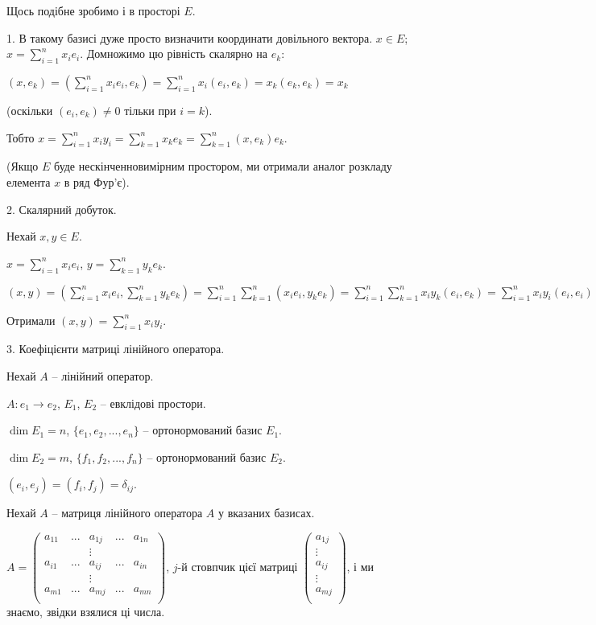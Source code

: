 Щось подібне зробимо і в просторі $E$.

1. В такому базисі дуже просто визначити координати довільного вектора.
$x \in E$; $x = \sum\limits_{i=1}^n x_i e_i$. Домножимо цю рівність скалярно на $e_k$:

$(x, e_k)
= (\sum\limits_{i=1}^n x_i e_i, e_k)
= \sum\limits_{i=1}^n x_i (e_i, e_k)
= x_k (e_k, e_k)
= x_k$

(оскільки $(e_i, e_k) \neq 0$ тільки при $i = k$).

Тобто $x = \sum\limits_{i=1}^n x_i y_i
= \sum\limits_{k=1}^n x_k e_k
= \sum\limits_{k=1}^n (x, e_k) e_k.$

(Якщо $E$ буде нескінченновимірним простором, ми отримали аналог
розкладу елемента $x$ в ряд Фур’є).

2. Скалярний добуток.

Нехай $x, y \in E$.

$x = \sum\limits_{i=1}^n x_i e_i$, $y = \sum\limits_{k=1}^n y_k e_k$.

$(x,y)
= (\sum\limits_{i=1}^n x_i e_i, \sum\limits_{k=1}^n y_k e_k)
= \sum\limits_{i=1}^n \sum\limits_{k=1}^n (x_i e_i, y_k e_k)
= \sum\limits_{i=1}^n \sum\limits_{k=1}^n x_i y_k (e_i, e_k)
= \sum\limits_{i=1}^n x_i y_i (e_i, e_i)
= \sum\limits_{i=1}^n x_i y_i.$

Отримали $(x,y) = \sum\limits_{i=1}^n x_i y_i.$

3. Коефіцієнти матриці лінійного оператора.

Нехай $A$ -- лінійний оператор.

$A:  e_1 \rightarrow e_2$, $E_1$, $E_2$ -- евклідові простори.

$\dim E_1 = n$, $\{e_1, e_2, ..., e_n\}$ -- ортонормований базис $E_1$.

$\dim E_2 = m$, $\{f_1, f_2, ..., f_n\}$ -- ортонормований базис $E_2$.

$(e_i,e_j) = (f_i,f_j) = \delta_{ij}$.

Нехай $A$ -- матриця лінійного оператора $A$ у вказаних базисах.

$A = \begin{pmatrix}
	a_{11} & ... & a_{1j} & ... & a_{1n} \\
	& & \vdots & & \\
	a_{i1} & ... & a_{ij} & ... & a_{in} \\
	& & \vdots & & \\
	a_{m1} & ... & a_{mj} & ... & a_{mn} \\
\end{pmatrix}$, $j$-й стовпчик цієї матриці $\begin{pmatrix}
	a_{1j} \\
	\vdots \\
	a_{ij} \\
	\vdots \\
	a_{mj} \\
\end{pmatrix}$, і ми знаємо, звідки взялися ці числа.

